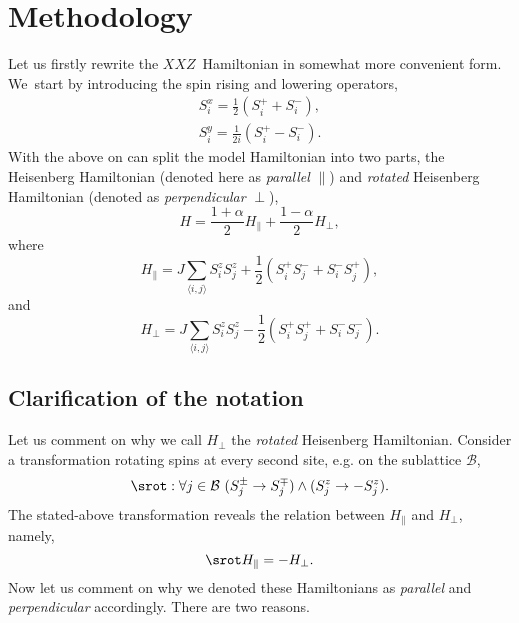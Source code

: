 \documentclass[12pt, a4paper]{article}
\newcommand{\mean}[1]{\langle#1\rangle}
\begin{document}
\section{Methodology}
Let us firstly rewrite the $XXZ$~Hamiltonian in somewhat more convenient form. We~start by introducing the spin rising and lowering operators,
\begin{equation}
\begin{aligned}
S_i^x = \frac{1}{2}\left(S_i^+ + S_i^-\right), \\
S_i^y = \frac{1}{2i}\left(S_i^+ - S_i^-\right).
\end{aligned}
\end{equation}
With the above on can split the model Hamiltonian into two parts, the Heisenberg Hamiltonian (denoted here as \textit{parallel} $\parallel$) and \textit{rotated} Heisenberg Hamiltonian (denoted as \textit{perpendicular} $\perp$),
\begin{equation}
H = \frac{1+\alpha}{2} H_{\parallel} + \frac{1-\alpha}{2} H_{\perp},
\end{equation}
where
\begin{equation}
H_{\parallel} = J\sum_{\mean{i,j}}S_i^z S_j^z + \frac{1}{2}\left(S_i^+ S_j^- + S_i^- S_j^+\right),
\end{equation}
and
\begin{equation}
H_{\perp} = J\sum_{\mean{i,j}} S_i^z S_j^z - \frac{1}{2}\left(S_i^+ S_j^+ + S_i^- S_j^-\right).
\end{equation}

\subsection{Clarification of the notation}
Let us comment on why we call $H_{\perp}$ the \textit{rotated} Heisenberg Hamiltonian. Consider a transformation rotating spins at every second site, e.g. on the sublattice $\mathcal{B}$,
\begin{equation}
\srot : \forall j\in\mathcal{B} \ (S_j^{\pm} \rightarrow S_j^{\mp}) \land (S_j^{z} \rightarrow -S_j^{z}).
\end{equation}
The stated-above transformation reveals the relation between $H_{\parallel}$ and $H_{\perp}$, namely,
\begin{equation}\label{eq:rot_relation}
\srot H_{\parallel} = -H_{\perp}.
\end{equation}
Now let us comment on why we denoted these Hamiltonians as \textit{parallel} and \textit{perpendicular} accordingly. There are two reasons. 
\end{document}
